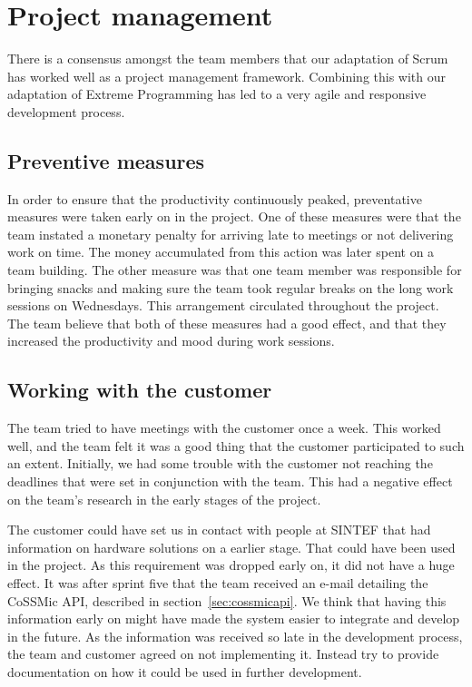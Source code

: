 \section{Project management}
There is a consensus amongst the team members that our adaptation of Scrum has worked well as a project management framework. Combining this with our adaptation of Extreme Programming has led to a very agile and responsive development process.

\subsection{Preventive measures}
In order to ensure that the productivity continuously peaked, preventative measures were taken early on in the project. One of these measures were that the team instated a monetary penalty for arriving late to meetings or not delivering work on time. The money accumulated from this action was later spent on a team building. The other measure was that one team member was responsible for bringing snacks and making sure the team took regular breaks on the long work sessions on Wednesdays. This arrangement circulated throughout the project. The team believe that both of these measures had a good effect, and that they increased the productivity and mood during work sessions.

\subsection{Working with the customer}
 The team tried to have meetings with the customer once a week. This worked well, and the team felt it was a good thing that the customer participated to such an extent. Initially, we had some trouble with the customer not reaching the deadlines that were set in conjunction with the team. This had a negative effect on the team's research in the early stages of the project. 

The customer could have set us in contact with people at SINTEF that had information on hardware solutions on a earlier stage. That could have been used in the project. As this requirement was dropped early on, it did not have a huge effect. It was after sprint five that the team received an e-mail detailing the CoSSMic API, described in section~\ref{sec:cossmicapi}. We think that having this information early on might have made the system easier to integrate and develop in the future. As the information was received so late in the development process, the team and customer agreed on not implementing it. Instead try to provide documentation on how it could be used in further development.

